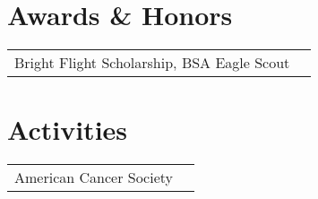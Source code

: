 \documentclass[margin]{res}
\begin{document}
\begin{resume}
	\section{Awards \& Honors} 
      \begin{tabular}{l p{4in}}
        Bright Flight Scholarship, BSA Eagle Scout \\ [1pt]
      \end{tabular}
      
	\section{Activities} 
      \begin{tabular}{l p{4in}}
        American Cancer Society \\ [1pt]
      \end{tabular}
      
  \end{resume} 
\end{document}
